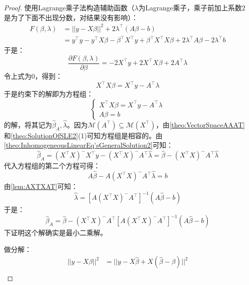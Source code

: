 \begin{proof}
	使用Lagrange乘子法构造辅助函数（$\lambda$为Lagrange乘子，乘子前加上系数$2$是为了下面不出现分数，对结果没有影响）：
	\begin{align*}
		F(\beta,\lambda)&=||y-X\beta||^2+2\lambda^{\top}(A\beta-b) \\
		&=y^{\top}y-y^{\top}X\beta-\beta^{\top}X^{\top}y+\beta^{\top}X^{\top}X\beta+2\lambda^{\top}A\beta-2\lambda^{\top}b
	\end{align*}
	于是：
	\begin{equation*}
		\frac{\partial F(\beta,\lambda)}{\partial\beta}=-2X^{\top}y+2X^{\top}X\beta+2A^{\top}\lambda
	\end{equation*}
	令上式为$0$，得到：
	\begin{equation*}
		X^{\top}X\beta=X^{\top}y-A^{\top}\lambda
	\end{equation*}
	于是约束下的解即为方程组：
	\begin{equation*}
		\begin{cases}
			X^{\top}X\beta=X^{\top}y-A^{\top}\lambda \\
			A\beta=b
		\end{cases}
	\end{equation*}
	的解，将其记为$\hat{\beta}_A,\hat{\lambda}$。因为$\mathcal{M}(A^{\top})\subseteq\mathcal{M}(X^{\top})$，由\cref{theo:VectorSpaceAAAT}和\cref{theo:SolutionOfSLE2}(1)可知方程组是相容的。由\cref{theo:InhomogeneousLinearEq'sGeneralSolution2}可知：
	\begin{equation*}
		\hat{\beta}_A=(X^{\top}X)^-X^{\top}y-(X^{\top}X)^-A^{\top}\hat{\lambda}=\hat{\beta}-(X^{\top}X)^-A^{\top}\hat{\lambda}
	\end{equation*}
	代入方程组的第二个方程可得：
	\begin{equation*}
		A\hat{\beta}-A(X^{\top}X)^-A^{\top}\hat{\lambda}=b
	\end{equation*}
	由\cref{lem:AXTXAT}可知：
	\begin{equation*}
		\hat{\lambda}=[A(X^{\top}X)^-A^{\top}]^{-1}(A\hat{\beta}-b)
	\end{equation*}
	于是：
	\begin{equation*}
		\hat{\beta}_A=\hat{\beta}-(X^{\top}X)^-A^{\top}[A(X^{\top}X)^-A^{\top}]^{-1}(A\hat{\beta}-b)
	\end{equation*}
	下证明这个解确实是最小二乘解。\par
	做分解：
	\begin{align*}
		||y-X\beta||^2
		&=||y-X\hat{\beta}+X(\hat{\beta}-\beta)||^2 \\

\end{align*}
\end{proof}
